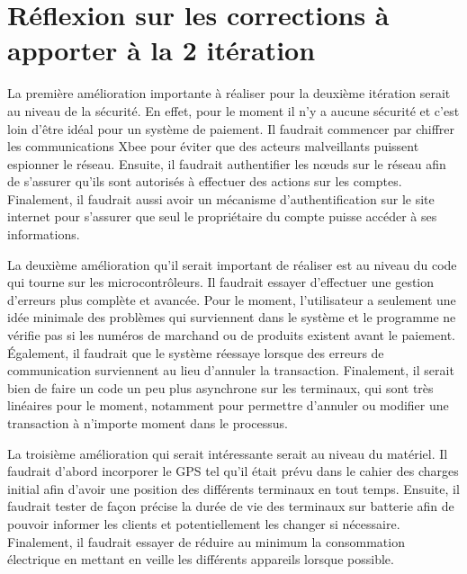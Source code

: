 \section{Réflexion sur les corrections à apporter à la 2\ieme{} itération}
La première amélioration importante à réaliser pour la deuxième itération serait au niveau de la sécurité. En effet, pour le moment il n’y a aucune sécurité et c’est loin d’être idéal pour un système de paiement. Il faudrait commencer par chiffrer les communications Xbee pour éviter que des acteurs malveillants puissent espionner le réseau. Ensuite, il faudrait authentifier les n\oe{}uds sur le réseau afin de s’assurer qu’ils sont autorisés à effectuer des actions sur les comptes. Finalement, il faudrait aussi avoir un mécanisme d’authentification sur le site internet pour s’assurer que seul le propriétaire du compte puisse accéder à ses informations.

La deuxième amélioration qu'il serait important de réaliser est au niveau du code qui tourne sur les microcontrôleurs. Il faudrait essayer d'effectuer une gestion d’erreurs plus complète et avancée. Pour le moment, l’utilisateur a seulement une idée minimale des problèmes qui surviennent dans le système et le programme ne vérifie pas si les numéros de marchand ou de produits existent avant le paiement. Également, il faudrait que le système réessaye lorsque des erreurs de communication surviennent au lieu d'annuler la transaction. Finalement, il serait bien de faire un code un peu plus asynchrone sur les terminaux, qui sont très linéaires pour le moment, notamment pour permettre d’annuler ou modifier une transaction à n’importe moment dans le processus.

La troisième amélioration qui serait intéressante serait au niveau du matériel. Il faudrait d’abord incorporer le GPS tel qu’il était prévu dans le cahier des charges initial afin d’avoir une position des différents terminaux en tout temps. Ensuite, il faudrait tester de façon précise la durée de vie des terminaux sur batterie afin de pouvoir informer les clients et potentiellement les changer si nécessaire. Finalement, il faudrait essayer de réduire au minimum la consommation électrique en mettant en veille les différents appareils lorsque possible.

